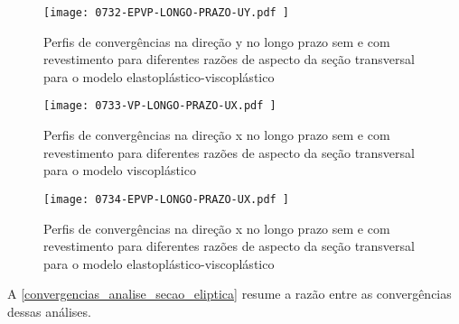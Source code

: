 \begin{figure}[H]
	\begin{center}
		\texttt{[image: 0732-EPVP-LONGO-PRAZO-UY.pdf
		]}
	\end{center}
	\caption{\label{EPVP-LONGO-PRAZO-UY}Perfis de convergências na direção y no longo prazo sem e com revestimento para diferentes razões de aspecto da seção transversal para o modelo elastoplástico-viscoplástico}
\end{figure}

\begin{figure}[H]
	\begin{center}
		\texttt{[image: 0733-VP-LONGO-PRAZO-UX.pdf
		]}
	\end{center}
	\caption{\label{VP-LONGO-PRAZO-UX}Perfis de convergências na direção x no longo prazo sem e com revestimento para diferentes razões de aspecto da seção transversal para o modelo viscoplástico}
\end{figure}

\begin{figure}[H]
	\begin{center}
		\texttt{[image: 0734-EPVP-LONGO-PRAZO-UX.pdf
		]}
	\end{center}
	\caption{\label{EPVP-LONGO-PRAZO-UX}Perfis de convergências na direção x no longo prazo sem e com revestimento para diferentes razões de aspecto da seção transversal para o modelo elastoplástico-viscoplástico}
\end{figure}

A \autoref{convergencias_analise_secao_eliptica} resume a razão entre as convergências dessas análises.


